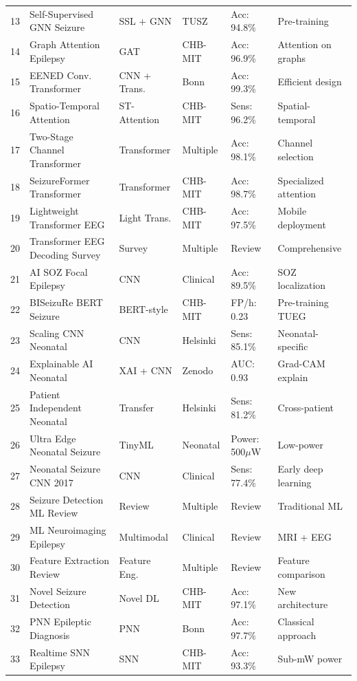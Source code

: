 \documentclass[12pt,a4paper]{article}
\begin{document}
\begin{longtable}{p{0.5cm}p{4cm}p{2.5cm}p{1.5cm}p{2cm}p{2cm}}
13 & Self-Supervised GNN Seizure & SSL + GNN & TUSZ & Acc: 94.8\% & Pre-training \\
14 & Graph Attention Epilepsy & GAT & CHB-MIT & Acc: 96.9\% & Attention on graphs \\
15 & EENED Conv. Transformer & CNN + Trans. & Bonn & Acc: 99.3\% & Efficient design \\
16 & Spatio-Temporal Attention & ST-Attention & CHB-MIT & Sens: 96.2\% & Spatial-temporal \\
17 & Two-Stage Channel Transformer & Transformer & Multiple & Acc: 98.1\% & Channel selection \\
18 & SeizureFormer Transformer & Transformer & CHB-MIT & Acc: 98.7\% & Specialized attention \\
19 & Lightweight Transformer EEG & Light Trans. & CHB-MIT & Acc: 97.5\% & Mobile deployment \\
20 & Transformer EEG Decoding Survey & Survey & Multiple & Review & Comprehensive \\
21 & AI SOZ Focal Epilepsy & CNN & Clinical & Acc: 89.5\% & SOZ localization \\
22 & BISeizuRe BERT Seizure & BERT-style & CHB-MIT & FP/h: 0.23 & Pre-training TUEG \\
23 & Scaling CNN Neonatal & CNN & Helsinki & Sens: 85.1\% & Neonatal-specific \\
24 & Explainable AI Neonatal & XAI + CNN & Zenodo & AUC: 0.93 & Grad-CAM explain \\
25 & Patient Independent Neonatal & Transfer & Helsinki & Sens: 81.2\% & Cross-patient \\
26 & Ultra Edge Neonatal Seizure & TinyML & Neonatal & Power: 500$\mu$W & Low-power \\
27 & Neonatal Seizure CNN 2017 & CNN & Clinical & Sens: 77.4\% & Early deep learning \\
28 & Seizure Detection ML Review & Review & Multiple & Review & Traditional ML \\
29 & ML Neuroimaging Epilepsy & Multimodal & Clinical & Review & MRI + EEG \\
30 & Feature Extraction Review & Feature Eng. & Multiple & Review & Feature comparison \\
31 & Novel Seizure Detection & Novel DL & CHB-MIT & Acc: 97.1\% & New architecture \\
32 & PNN Epileptic Diagnosis & PNN & Bonn & Acc: 97.7\% & Classical approach \\
33 & Realtime SNN Epilepsy & SNN & CHB-MIT & Acc: 93.3\% & Sub-mW power \\

\end{longtable}
\end{document}
